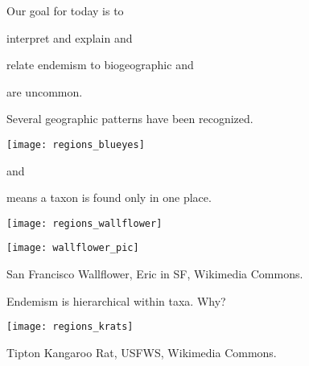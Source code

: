 \documentclass[t]{beamer}
\begin{document}

\begin{frame}[t]{Our goal for today is to }

	\hangpara interpret and explain  and
	
	\hangpara relate endemism to biogeographic  and 
	
\end{frame}
%
{
\begin{frame}[b]{ are uncommon.}

\end{frame}
}
%
\begin{frame}[t]{Several geographic patterns have been recognized.}
	\begin{multicols}{2}
	
		\noindent\texttt{[image: regions\_blueyes]}
	
		\columnbreak
		
		\hangpara{}
		
		\hangpara{}
		
		\hangpara{} and
	
		\hangpara{}
	
	\end{multicols}
\end{frame}
%
\begin{frame}[t]{ means a taxon is found only in one place.}
	\begin{multicols}{2}
	
		\texttt{[image: regions\_wallflower]}
	
		\columnbreak
		
		\hfil\texttt{[image: wallflower\_pic]}\hfill
	
		\vfill
			
	\end{multicols}

	\vfilll
	
	\tiny\hfill San Francisco Wallflower, Eric in SF, Wikimedia Commons.

\end{frame}
%
\begin{frame}[t]{Endemism is hierarchical within taxa. Why?}

	\begin{center}
		\texttt{[image: regions\_krats]}
	\end{center}

	\vfilll
	
	\tiny\hfill Tipton Kangaroo Rat, USFWS, Wikimedia Commons.
\end{frame}
\end{document}
